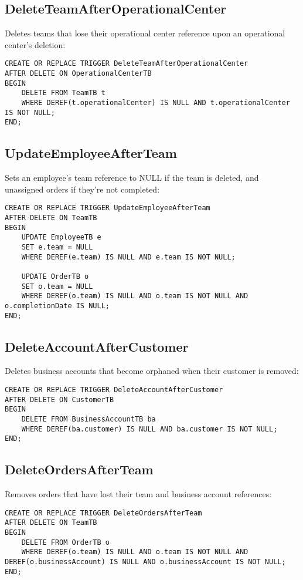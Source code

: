 \subsection*{DeleteTeamAfterOperationalCenter}
Deletes teams that lose their operational center reference upon an operational center's deletion:
\begin{lstlisting}
CREATE OR REPLACE TRIGGER DeleteTeamAfterOperationalCenter
AFTER DELETE ON OperationalCenterTB
BEGIN
    DELETE FROM TeamTB t
    WHERE DEREF(t.operationalCenter) IS NULL AND t.operationalCenter IS NOT NULL;
END;
\end{lstlisting}

\subsection*{UpdateEmployeeAfterTeam}
Sets an employee's team reference to NULL if the team is deleted, and unassigned orders if they're not completed:
\begin{lstlisting}
CREATE OR REPLACE TRIGGER UpdateEmployeeAfterTeam
AFTER DELETE ON TeamTB
BEGIN
    UPDATE EmployeeTB e
    SET e.team = NULL
    WHERE DEREF(e.team) IS NULL AND e.team IS NOT NULL;

    UPDATE OrderTB o
    SET o.team = NULL
    WHERE DEREF(o.team) IS NULL AND o.team IS NOT NULL AND o.completionDate IS NULL;
END;
\end{lstlisting}

\subsection*{DeleteAccountAfterCustomer}
Deletes business accounts that become orphaned when their customer is removed:
\begin{lstlisting}
CREATE OR REPLACE TRIGGER DeleteAccountAfterCustomer
AFTER DELETE ON CustomerTB
BEGIN
    DELETE FROM BusinessAccountTB ba
    WHERE DEREF(ba.customer) IS NULL AND ba.customer IS NOT NULL;
END;
\end{lstlisting}

\subsection*{DeleteOrdersAfterTeam}
Removes orders that have lost their team and business account references:
\begin{lstlisting}
CREATE OR REPLACE TRIGGER DeleteOrdersAfterTeam
AFTER DELETE ON TeamTB
BEGIN
    DELETE FROM OrderTB o
    WHERE DEREF(o.team) IS NULL AND o.team IS NOT NULL AND DEREF(o.businessAccount) IS NULL AND o.businessAccount IS NOT NULL;
END;
\end{lstlisting}

